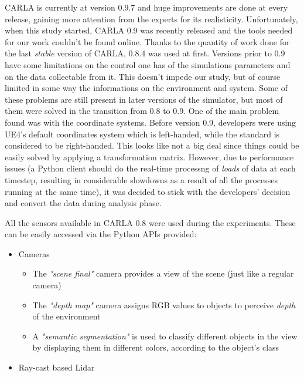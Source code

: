 CARLA is currently at version 0.9.7 and huge improvements are done at every release, gaining more attention from the experts for its realisticity. Unfortunately, when this study started, CARLA 0.9 was recently released and the tools needed for our work couldn't be found online. Thanks to the quantity of work done for the last \textit{stable} version of CARLA, 0.8.4 was used at first.\newline
Versions prior to 0.9 have some limitations on the control one has of the simulations parameters and on the data collectable from it. This doesn't impede our study, but of course limited in some way the informations on the environment and system. Some of these problems are still present in later versions of the simulator, but most of them were solved in the transition from 0.8 to 0.9.\newline\newline
One of the main problem found was with the coordinate systems. Before version 0.9, developers were using UE4's default coordinates system which is left-handed, while the standard is considered to be right-handed. This looks like not a big deal since things could be easily solved by applying a transformation matrix. However, due to performance issues (a Python client should do the real-time processng of \textsl{loads} of data at each timestep, resulting in considerable slowdowns as a result of all the processes running at the same time), it was decided to stick with the developers' decision and convert the data during analysis phase.

All the sensors available in CARLA 0.8 were used during the experiments. These can be easily accessed via the Python APIs provided:

\begin{itemize}
	\item Cameras
	\begin{itemize}
		\item The \textsl{"scene final"} camera provides a view of the scene (just like a regular camera)
		\item The \textsl{"depth map"} camera assigns RGB values to objects to perceive \textsl{depth} of the environment
		\item A \textsl{"semantic segmentation"} is used to classify different objects in the view by displaying them in different colors, according to the object's class
	\end{itemize}
	\item Ray-cast based Lidar
\end{itemize}

